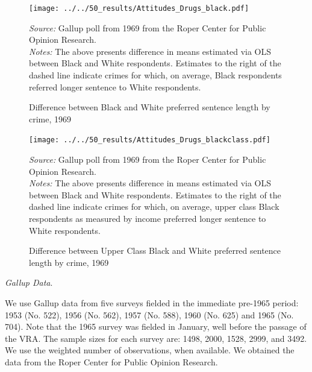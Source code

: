 \documentclass[12pt]{article}
\begin{document}
\begin{figure}[h!]
 \begin{center}
 \caption{Difference between Black and White preferred sentence length by crime, 1969}
 \small
		 \texttt{[image: ../../50\_results/Attitudes\_Drugs\_black.pdf]}
 \label{figure_dope}
 	\end{center}
 	{\scriptsize{\emph{Source:} Gallup poll from 1969 from the Roper Center for Public Opinion Research. }} \\
	{\scriptsize{\emph{Notes:} The above presents difference in means estimated via OLS between Black and White respondents.  Estimates to the right of the dashed line indicate crimes for which, on average, Black respondents referred longer sentence to White respondents.  \singlespacing }}
\end{figure} \normalsize



\begin{figure}[h!]
 \begin{center}
 \caption{Difference between Upper Class Black and White preferred sentence length by crime, 1969}
 \small
		 \texttt{[image: ../../50\_results/Attitudes\_Drugs\_blackclass.pdf]}
 \label{figure_dope2}
 	\end{center}
 	{\scriptsize{\emph{Source:} Gallup poll from 1969 from the Roper Center for Public Opinion Research. }} \\
	{\scriptsize{\emph{Notes:} The above presents difference in means estimated via OLS between Black and White respondents.  Estimates to the right of the dashed line indicate crimes for which, on average, upper class Black respondents as measured by income preferred longer sentence to White respondents.  \singlespacing }}
\end{figure} \normalsize



\vspace{.25in}
\emph{Gallup Data}.

We use Gallup data from five surveys fielded in the immediate pre-1965 period: 1953 (No. 522), 1956 (No. 562), 1957 (No. 588), 1960 (No. 625) and 1965 (No. 704).  Note that the 1965 survey was fielded in January, well before the passage of the VRA.  The sample sizes for each survey are: 1498, 2000, 1528, 2999, and 3492.  We use the weighted number of observations, when available.  We obtained the data from the Roper Center for Public Opinion Research.
\end{document}
